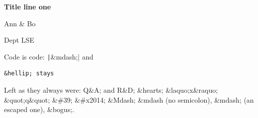 {\noindent\LARGE\bfseries Title line \textendash{} one\par}

{\noindent\large Ann \& Bo\par}

{\noindent Dept \textemdash{} LSE\par}

Code is code: \texttt|&mdash;| and

\begin{verbatim}
&hellip; stays
\end{verbatim}

Left as they always were: Q\&A; and R\&D; \&hearts; \&laquo;x\&raquo; \&quot;q\&quot;
\&\#39; \&\#x2014; \&Mdash; \&mdash (no semicolon), \&mdash; (an escaped one), \&bogus;.


